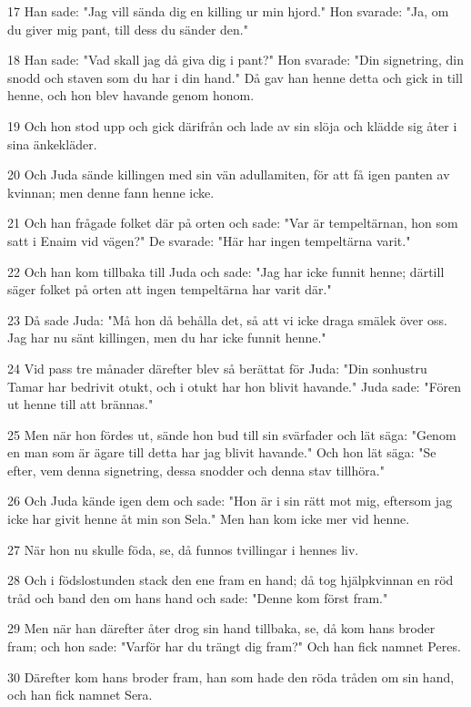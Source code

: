 \par 17 Han sade: "Jag vill sända dig en killing ur min hjord." Hon svarade: "Ja, om du giver mig pant, till dess du sänder den."
\par 18 Han sade: "Vad skall jag då giva dig i pant?" Hon svarade: "Din signetring, din snodd och staven som du har i din hand." Då gav han henne detta och gick in till henne, och hon blev havande genom honom.
\par 19 Och hon stod upp och gick därifrån och lade av sin slöja och klädde sig åter i sina änkekläder.
\par 20 Och Juda sände killingen med sin vän adullamiten, för att få igen panten av kvinnan; men denne fann henne icke.
\par 21 Och han frågade folket där på orten och sade: "Var är tempeltärnan, hon som satt i Enaim vid vägen?" De svarade: "Här har ingen tempeltärna varit."
\par 22 Och han kom tillbaka till Juda och sade: "Jag har icke funnit henne; därtill säger folket på orten att ingen tempeltärna har varit där."
\par 23 Då sade Juda: "Må hon då behålla det, så att vi icke draga smälek över oss. Jag har nu sänt killingen, men du har icke funnit henne."
\par 24 Vid pass tre månader därefter blev så berättat för Juda: "Din sonhustru Tamar har bedrivit otukt, och i otukt har hon blivit havande." Juda sade: "Fören ut henne till att brännas."
\par 25 Men när hon fördes ut, sände hon bud till sin svärfader och lät säga: "Genom en man som är ägare till detta har jag blivit havande." Och hon lät säga: "Se efter, vem denna signetring, dessa snodder och denna stav tillhöra."
\par 26 Och Juda kände igen dem och sade: "Hon är i sin rätt mot mig, eftersom jag icke har givit henne åt min son Sela." Men han kom icke mer vid henne.
\par 27 När hon nu skulle föda, se, då funnos tvillingar i hennes liv.
\par 28 Och i födslostunden stack den ene fram en hand; då tog hjälpkvinnan en röd tråd och band den om hans hand och sade: "Denne kom först fram."
\par 29 Men när han därefter åter drog sin hand tillbaka, se, då kom hans broder fram; och hon sade: "Varför har du trängt dig fram?" Och han fick namnet Peres.
\par 30 Därefter kom hans broder fram, han som hade den röda tråden om sin hand, och han fick namnet Sera.


